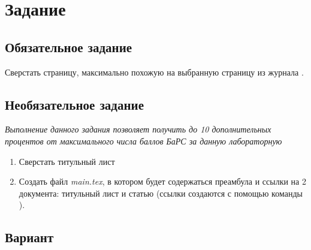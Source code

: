 \section{Задание}

\subsection{Обязательное задание}

Сверстать страницу, максимально похожую на выбранную страницу из журнала
.

\subsection{Необязательное задание}

\emph{Выполнение данного задания позволяет получить до 10 дополнительных процентов от максимального числа баллов БаРС за данную лабораторную}

\begin{enumerate}
    \item Сверстать титульный лист
    \item Создать файл \emph{main.tex}, в котором будет содержаться преамбула и ссылки на 2 документа: титульный лист и статью (ссылки создаются с помощью команды \verb||).
\end{enumerate}

\subsection{Вариант}


